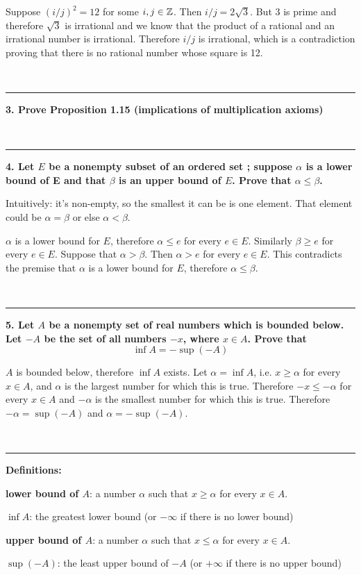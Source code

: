Suppose $(i/j)^2 = 12$ for some $i,j \in \mathbb{Z}$. Then $i/j = 2\sqrt{3}$. But $3$
is prime and therefore $\sqrt{3}$ is irrational and we know that the product of
a rational and an irrational number is irrational. Therefore $i/j$ is
irrational, which is a contradiction proving that there is no rational number
whose square is 12.


~\\\hrule
\textbf{3. Prove Proposition 1.15 (implications of multiplication axioms)}

~\\\hrule
\textbf{4. Let $E$ be a nonempty subset of an ordered set ; suppose $\alpha$ is a
lower bound of E and that $\beta$ is an upper bound of $E$. Prove that $\alpha
\leq \beta$.}

Intuitively: it's non-empty, so the smallest it can be is one element. That
element could be $\alpha = \beta$ or else $\alpha < \beta$.

$\alpha$ is a lower bound for $E$, therefore $\alpha \leq e$ for every $e \in
E$. Similarly $\beta \geq e$ for every $e \in E$. Suppose that $\alpha >
\beta$. Then $\alpha > e$ for every $e \in E$. This contradicts the premise
that $\alpha$ is a lower bound for $E$, therefore $\alpha \leq \beta$.


~\\\hrule
\textbf{5. Let $A$ be a nonempty set of real numbers which is bounded below. Let $-A$
be the set of all numbers $-x$, where $x \in A$. Prove that
$$
\inf A = - \sup(-A)
$$
}

$A$ is bounded below, therefore $\inf A$ exists. Let $\alpha = \inf A$, i.e. $x
\geq \alpha$ for every $x \in A$, and $\alpha$ is the largest number for which
this is true. Therefore $-x \leq -\alpha$ for every $x \in A$ and $-\alpha$ is
the smallest number for which this is true. Therefore $-\alpha=\sup(-A)$ and
$\alpha=-\sup(-A)$.


~\\\hrule
\textbf{Definitions:}

\textbf{lower bound of $A$}: a number $\alpha$ such that $x \geq \alpha$ for every $x \in A$.

\textbf{$\inf A$}: the greatest lower bound (or $-\infty$ if there is no lower bound)

\textbf{upper bound of $A$}: a number $\alpha$ such that $x \leq \alpha$ for every $x \in A$.

\textbf{$\sup(-A)$}: the least upper bound of $-A$ (or $+\infty$ if there is no upper bound)

